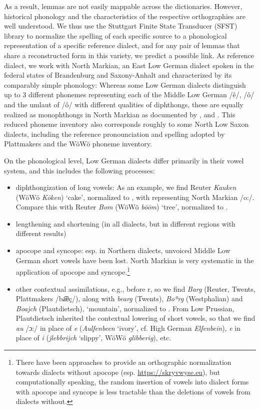 \documentclass{article}
\newcommand{\word}[1]{\textsl{#1}}
\begin{document}
As a result, lemmas are not easily mappable across the dictionaries. However, historical phonology and the characteristics of the respective orthographies are well understood.
We thus use the Stuttgart Finite State Transducer (SFST) library to normalize the spelling of each specific source to a phonological representation of a specific reference dialect, and for any pair of lemmas that share a reconstructed form in this variety, we predict a possible link. 
As reference dialect, we work with North Markian, an East Low German dialect spoken in the federal states of Brandenburg and Saxony-Anhalt and characterized by its comparably simple phonology: Whereas some Low German dialects distinguish up to 3 different phonemes representing each of the Middle Low German /ê/, /ô/ and the umlaut of /ô/ with different qualities of diphthongs, these are equally realized as monophthongs in North Markian as documented by \cite{pfaff1898vocale}, \cite{mackel1905mundart} and \cite{teuchert1907mundart}. This reduced phoneme inventory also corresponds roughly to some North Low Saxon dialects, including the reference pronounciation and spelling adopted by Plattmakers and the WöWö phoneme inventory.

On the phonological level, Low German dialects differ primarily in their vowel system, and this includes the following processes:

\begin{itemize}
\item diphthongization of long vowels: As an example, we find Reuter \word{Kauken} (WöWö \word{Kōken}) `cake', normalized to , with  representing North Markian /o:/. Compare this with Reuter \word{Bom} (WöWö \word{bōōm}) `tree', normalized to .
\item lengthening and shortening (in all dialects, but in different regions with different results)
\item apocope and syncope: esp. in Northern dialects, unvoiced Middle Low German short vowels have been lost. North Markian is very systematic in the application of apocope and syncope.\footnote{
    There have been approaches to provide an orthographic normalization towards dialects without apocope (esp. \url{https://skryvwyse.eu}), but computationally speaking, the random insertion of vowels into dialect forms with apocope and syncope is less tractable than the deletions of vowels from dialects without.
}
\item other contextual assimilations, e.g., before r, so we find \word{Barg} (Reuter, Twents, Plattmakers /ba͡ɐç/), along with \word{bearg} (Twents), \word{Boªrg} (Westphalian) and \word{Boajch} (Plautdietsch),  `mountain', normalized to . From Low Prussian, Plautdietsch inherited the contextual lowering of short vowels, so that we find \word{au} /ɔ:/ in place of \word{e} (\word{Aulfenbeen} `ivory', cf. High German \word{Elfenbein}), \word{e} in place of \word{i} (\word{jlebbrijch} `slippy', WöWö \word{glibberig}), etc.
\end{itemize}
\end{document}
